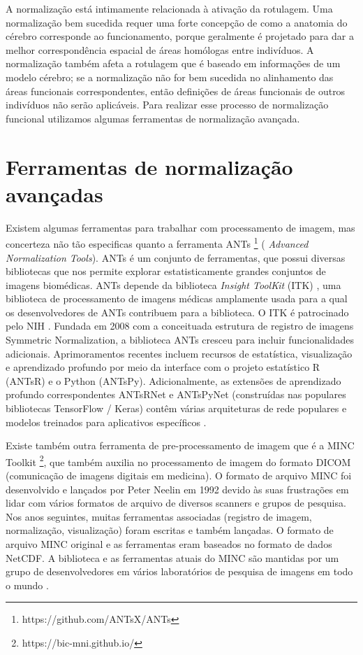 \documentclass[openright]{UFRGS} %
\begin{document}
A normalização está intimamente relacionada à ativação da rotulagem. Uma normalização bem sucedida requer uma forte concepção de como a anatomia do cérebro corresponde ao funcionamento, porque geralmente é
projetado para dar a melhor correspondência espacial de áreas homólogas entre indivíduos. A normalização também afeta a rotulagem que
é baseado em informações de um modelo cérebro; se a normalização não for bem sucedida no alinhamento das áreas funcionais correspondentes, então definições de áreas funcionais de outros indivíduos não serão aplicáveis. Para realizar esse processo de normalização funcional utilizamos algumas ferramentas de normalização avançada. 

\section{Ferramentas de normalização avançadas}

Existem  algumas ferramentas para trabalhar com processamento de imagem, mas concerteza não tão especificas quanto a ferramenta ANTs \footnote[1]{https://github.com/ANTsX/ANTs} ( \textit{Advanced Normalization Tools}). ANTs é um conjunto de ferramentas, que possui  diversas bibliotecas que nos permite explorar estatisticamente grandes conjuntos de imagens biomédicas.
ANTs depende da biblioteca \textit{Insight ToolKit} (ITK) , uma biblioteca de processamento de imagens médicas amplamente usada para a qual os desenvolvedores de ANTs contribuem para a biblioteca. O ITK é
patrocinado pelo NIH \cite{tustison2014advanced}. Fundada em 2008 com a conceituada estrutura de registro de imagens Symmetric Normalization, a biblioteca ANTs cresceu para incluir funcionalidades adicionais. Aprimoramentos recentes incluem recursos de estatística, visualização e aprendizado profundo por meio da interface com o projeto estatístico R (ANTsR) e o Python (ANTsPy). Adicionalmente, as extensões de aprendizado profundo correspondentes ANTsRNet e ANTsPyNet (construídas nas populares bibliotecas TensorFlow / Keras) contêm várias arquiteturas de rede populares e modelos treinados para aplicativos específicos \cite{tustison2014advanced}.

Existe também outra ferramenta de pre-processamento de imagem que é a  MINC Toolkit \footnote{https://bic-mni.github.io/}, que  também auxilia no processamento de imagem do formato DICOM (comunicação de imagens digitais em medicina). O formato de arquivo MINC  foi desenvolvido  e lançados por Peter Neelin em 1992 devido às suas frustrações em lidar com vários formatos de arquivo de diversos scanners e grupos de pesquisa. Nos anos seguintes, muitas ferramentas associadas (registro de imagem, normalização, visualização) foram escritas e também lançadas. O formato de arquivo MINC original e as ferramentas eram baseados no formato de dados NetCDF. A biblioteca e as ferramentas atuais do MINC são mantidas por um grupo de desenvolvedores em vários laboratórios de pesquisa de imagens em todo o mundo \cite{shafiei2020spatial}.
\end{document}
